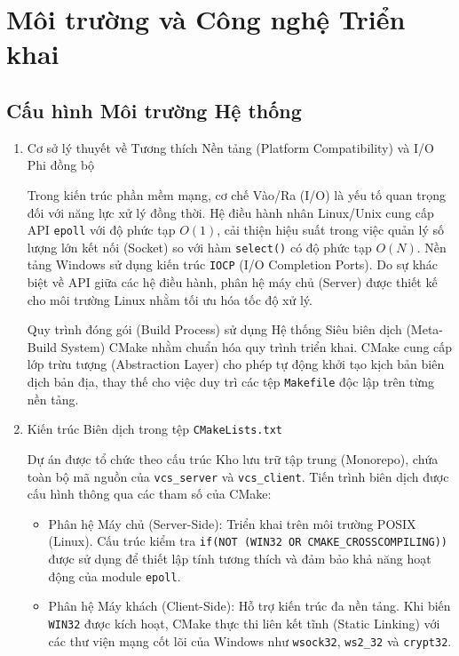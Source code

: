 \section{Môi trường và Công nghệ Triển khai}

\subsection{Cấu hình Môi trường Hệ thống}

\begin{enumerate}
    \item Cơ sở lý thuyết về Tương thích Nền tảng (Platform Compatibility) và I/O Phi đồng bộ
    
    Trong kiến trúc phần mềm mạng, cơ chế Vào/Ra (I/O) là yếu tố quan trọng đối với năng lực xử lý đồng thời. Hệ điều hành nhân Linux/Unix cung cấp API \texttt{epoll} với độ phức tạp $O(1)$, cải thiện hiệu suất trong việc quản lý số lượng lớn kết nối (Socket) so với hàm \texttt{select()} có độ phức tạp $O(N)$. Nền tảng Windows sử dụng kiến trúc \texttt{IOCP} (I/O Completion Ports). Do sự khác biệt về API giữa các hệ điều hành, phân hệ máy chủ (Server) được thiết kế cho môi trường Linux nhằm tối ưu hóa tốc độ xử lý.
    
    Quy trình đóng gói (Build Process) sử dụng Hệ thống Siêu biên dịch (Meta-Build System) CMake nhằm chuẩn hóa quy trình triển khai. CMake cung cấp lớp trừu tượng (Abstraction Layer) cho phép tự động khởi tạo kịch bản biên dịch bản địa, thay thế cho việc duy trì các tệp \texttt{Makefile} độc lập trên từng nền tảng.

    \item Kiến trúc Biên dịch trong tệp \texttt{CMakeLists.txt}
    
    Dự án được tổ chức theo cấu trúc Kho lưu trữ tập trung (Monorepo), chứa toàn bộ mã nguồn của \texttt{vcs\_server} và \texttt{vcs\_client}. Tiến trình biên dịch được cấu hình thông qua các tham số của CMake:
    
    \begin{itemize}[label={-}]
        \item Phân hệ Máy chủ (Server-Side): Triển khai trên môi trường POSIX (Linux). Cấu trúc kiểm tra \texttt{if(NOT (WIN32 OR CMAKE\_CROSSCOMPILING))} được sử dụng để thiết lập tính tương thích và đảm bảo khả năng hoạt động của module \texttt{epoll}.
        
        \item Phân hệ Máy khách (Client-Side): Hỗ trợ kiến trúc đa nền tảng. Khi biến \texttt{WIN32} được kích hoạt, CMake thực thi liên kết tĩnh (Static Linking) với các thư viện mạng cốt lõi của Windows như \texttt{wsock32}, \texttt{ws2\_32} và \texttt{crypt32}.
        

\end{itemize}
\end{enumerate}
